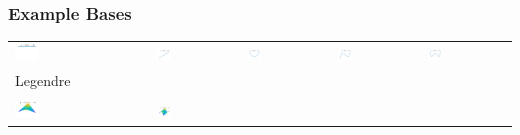 \documentclass[11pt,compress,xcolor={usenames,dvipsnames},aspectratio=169]{beamer}
\begin{document}
\begin{frame}
\frametitle{Example Bases}
\vspace{-3ex}
	\begin{tabular}{>{\centering}m{}>{\centering}m{}>{\centering}m{}>{\centering}m{}>{\centering}m{}}
		\includegraphics[width =0.18\textwidth]{FourierSampling/Legendre_Degree_0.png}  &
		\includegraphics[width =0.18\textwidth]{FourierSampling/Legendre_Degree_1.png}  &
		\includegraphics[width =0.18\textwidth]{FourierSampling/Legendre_Degree_2.png}  &
		\includegraphics[width =0.18\textwidth]{FourierSampling/Legendre_Degree_3.png}  &
		\includegraphics[width =0.18\textwidth]{FourierSampling/Legendre_Degree_4.png} 
	\tabularnewline[-7ex]
	Legendre
	\tabularnewline
	\tabularnewline
		\includegraphics[width =0.18\textwidth]{FourierSampling/Legendre_Degree_1_1.png}  &
\includegraphics[width =0.18\textwidth]{FourierSampling/Legendre_Degree_1_2.png}  &

\end{tabular}
\end{frame}
\end{document}
